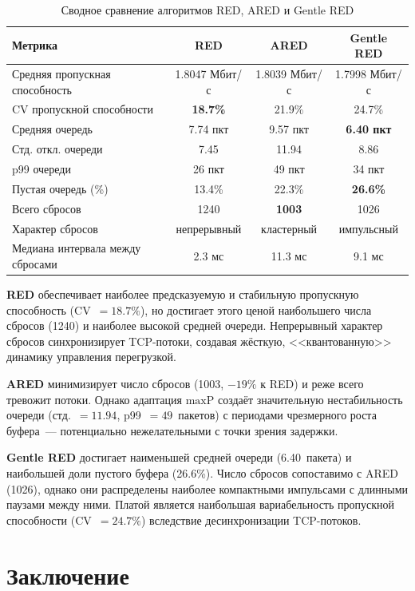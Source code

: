 \documentclass[12pt,a4paper]{article}
\begin{document}
\begin{table}[H]
\centering
\caption{Сводное сравнение алгоритмов RED, ARED и Gentle RED}
\label{tab:summary}
\begin{tabular}{lccc}
\toprule
Метрика & RED & ARED & Gentle RED \\
\midrule
Средняя пропускная способность & 1.8047 Мбит/с & 1.8039 Мбит/с & 1.7998 Мбит/с \\
CV пропускной способности & \textbf{18.7\%} & 21.9\% & 24.7\% \\
Средняя очередь & 7.74 пкт & 9.57 пкт & \textbf{6.40 пкт} \\
Стд. откл. очереди & 7.45 & 11.94 & 8.86 \\
p99 очереди & 26 пкт & 49 пкт & 34 пкт \\
Пустая очередь (\%) & 13.4\% & 22.3\% & \textbf{26.6\%} \\
Всего сбросов & 1240 & \textbf{1003} & 1026 \\
Характер сбросов & непрерывный & кластерный & импульсный \\
Медиана интервала между сбросами & 2.3 мс & 11.3 мс & 9.1 мс \\
\bottomrule
\end{tabular}
\end{table}

\textbf{RED} обеспечивает наиболее предсказуемую и стабильную пропускную способность (CV~$= 18.7\%$), но достигает этого ценой наибольшего числа сбросов (1240) и наиболее высокой средней очереди. Непрерывный характер сбросов синхронизирует TCP-потоки, создавая жёсткую, <<квантованную>> динамику управления перегрузкой.

\textbf{ARED} минимизирует число сбросов (1003, $-19\%$ к RED) и реже всего тревожит потоки. Однако адаптация $\mathrm{maxP}$ создаёт значительную нестабильность очереди (стд.~$= 11.94$, p99~$= 49$~пакетов) с периодами чрезмерного роста буфера~--- потенциально нежелательными с точки зрения задержки.

\textbf{Gentle RED} достигает наименьшей средней очереди (6.40~пакета) и наибольшей доли пустого буфера (26.6\%). Число сбросов сопоставимо с ARED (1026), однако они распределены наиболее компактными импульсами с длинными паузами между ними. Платой является наибольшая вариабельность пропускной способности (CV~$= 24.7\%$) вследствие десинхронизации TCP-потоков.

\section{Заключение}
\label{sec:conclusion}
\end{document}
